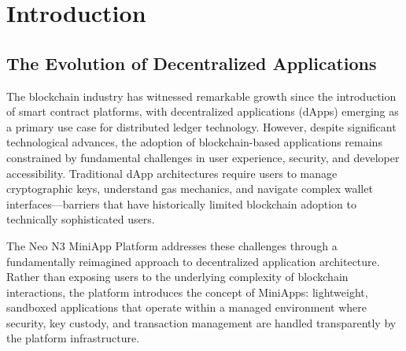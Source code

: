\documentclass[11pt,a4paper]{article}
\begin{document}
\newpage

\noindent{}

\vspace{1em}
\tableofcontents
\newpage

\section{Introduction}

\subsection{The Evolution of Decentralized Applications}

The blockchain industry has witnessed remarkable growth since the introduction of smart contract platforms, with decentralized applications (dApps) emerging as a primary use case for distributed ledger technology. However, despite significant technological advances, the adoption of blockchain-based applications remains constrained by fundamental challenges in user experience, security, and developer accessibility. Traditional dApp architectures require users to manage cryptographic keys, understand gas mechanics, and navigate complex wallet interfaces---barriers that have historically limited blockchain adoption to technically sophisticated users.

The Neo N3 MiniApp Platform addresses these challenges through a fundamentally reimagined approach to decentralized application architecture. Rather than exposing users to the underlying complexity of blockchain interactions, the platform introduces the concept of MiniApps: lightweight, sandboxed applications that operate within a managed environment where security, key custody, and transaction management are handled transparently by the platform infrastructure.
\end{document}
